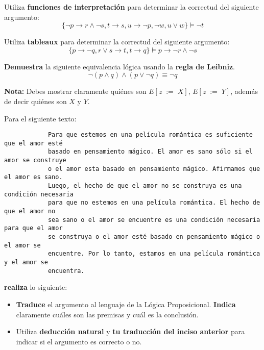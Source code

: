 \documentclass[oneside]{style}
\begin{document}
\begin{questions}[label=\protect\circled{\bfseries\arabic*}]

    \question
    {
        Utiliza \textbf{funciones de interpretación} para determinar la 
        correctud del siguiente argumento:
        \begin{equation*}
            \{\neg p \rightarrow r \land \neg s, t \rightarrow s, 
            u \rightarrow \neg p, \neg w, u \lor w\} \models \neg t
        \end{equation*}
    }  

    \question
    {
        Utiliza \textbf{tableaux} para determinar la correctud del siguiente 
        argumento:
        \begin{equation*}
            \{p \rightarrow \neg q, r \lor s \rightarrow t, 
            t \rightarrow q\} \models p \rightarrow \neg r \land \neg s
        \end{equation*}
    }

    \question
    {
        \textbf{Demuestra} la siguiente equivalencia lógica usando la 
        \textbf{regla de Leibniz}.
        \begin{equation*}
            \neg (p \land q) \land (p \lor \neg q) \equiv \neg q
        \end{equation*}

        \textbf{Nota:} Debes mostrar claramente quiénes son $E[z \; := \; X]$, 
        $E[z \; := \; Y]$, además de decir quiénes son $X$ y $Y$. 
    }

    \question
    {
        Para el siguiente texto:
        \begin{verbatim}
            Para que estemos en una película romántica es suficiente que el amor esté 
            basado en pensamiento mágico. El amor es sano sólo si el amor se construye 
            o el amor esta basado en pensamiento mágico. Afirmamos que el amor es sano.
            Luego, el hecho de que el amor no se construya es una condición necesaria
            para que no estemos en una película romántica. El hecho de que el amor no 
            sea sano o el amor se encuentre es una condición necesaria para que el amor 
            se construya o el amor esté basado en pensamiento mágico o el amor se 
            encuentre. Por lo tanto, estamos en una película romántica y el amor se 
            encuentra.
        \end{verbatim}

        \textbf{realiza} lo siguiente:
        \begin{itemize}
            \item \textbf{Traduce} el argumento al lenguaje de la Lógica 
            Proposicional. \textbf{Indica} claramente cuáles son las premisas 
            y cuál es la conclusión. 
            
            \item Utiliza \textbf{deducción natural} y \textbf{tu 
            traducción del inciso anterior} para indicar si el argumento es 
            correcto o no. 
        \end{itemize}
    }   
\end{questions}
\end{document}
